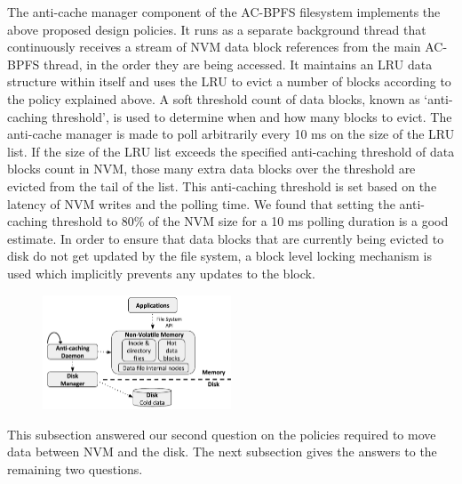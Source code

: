 The anti-cache manager component of the AC-BPFS filesystem implements the above proposed design policies. It runs as a separate background thread that continuously receives a stream of NVM data block references from the main AC-BPFS thread, in the order they are being accessed. It maintains an LRU data structure within itself and uses the LRU to evict a number of blocks according to the policy explained above. A soft threshold count of data blocks, known as `anti-caching threshold', is used to determine when and how many blocks to evict. The anti-cache manager is made to poll arbitrarily every 10 ms on the size of the LRU list. If the size of the LRU list exceeds the specified anti-caching threshold of data blocks count in NVM, those many extra data blocks over the threshold are evicted from the tail of the list. This anti-caching threshold is set based on the latency of NVM writes and the polling time. We found that setting the anti-caching threshold to 80\% of the NVM size for a 10 ms polling duration is a good estimate. In order to ensure that data blocks that are currently being evicted to disk do not get updated by the file  system, a block level locking mechanism is used which implicitly prevents any updates to the block.

\begin{figure}
\centering
\vspace{-0.2in}
\includegraphics[width=0.5\textwidth]{figs/bpfs.pdf}
\vspace{-0.2in}
\end{figure}

This subsection answered our second question on the policies required to move data between NVM and the disk. The next subsection gives the answers to the remaining two questions.


